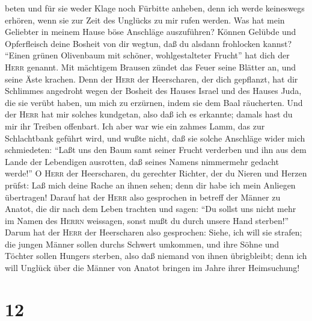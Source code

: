 beten und für sie weder Klage noch Fürbitte anheben, denn ich werde
keineswegs erhören, wenn sie zur Zeit des Unglücks zu mir rufen werden.
 Was hat mein Geliebter in meinem Hause böse Anschläge
auszuführen? Können Gelübde und Opferfleisch deine Bosheit von dir
wegtun, daß du alsdann frohlocken kannst?  ``Einen grünen
Olivenbaum mit schöner, wohlgestalteter Frucht'' hat dich der
\textsc{Herr} genannt. Mit mächtigem Brausen zündet das Feuer seine
Blätter an, und seine Äste krachen.  Denn der
\textsc{Herr} der Heerscharen, der dich gepflanzt, hat dir Schlimmes
angedroht wegen der Bosheit des Hauses Israel und des Hauses Juda, die
sie verübt haben, um mich zu erzürnen, indem sie dem Baal räucherten.
 Und der \textsc{Herr} hat mir solches kundgetan, also
daß ich es erkannte; damals hast du mir ihr Treiben offenbart.
 Ich aber war wie ein zahmes Lamm, das zur Schlachtbank
geführt wird, und wußte nicht, daß sie solche Anschläge wider mich
schmiedeten: ``Laßt uns den Baum samt seiner Frucht verderben und ihn
aus dem Lande der Lebendigen ausrotten, daß seines Namens nimmermehr
gedacht werde!''  O \textsc{Herr} der Heerscharen, du
gerechter Richter, der du Nieren und Herzen prüfst: Laß mich deine Rache
an ihnen sehen; denn dir habe ich mein Anliegen übertragen!
 Darauf hat der \textsc{Herr} also gesprochen in betreff
der Männer zu Anatot, die dir nach dem Leben trachten und sagen: ``Du
sollst uns nicht mehr im Namen des \textsc{Herrn} weissagen, sonst mußt
du durch unsere Hand sterben!''  Darum hat der
\textsc{Herr} der Heerscharen also gesprochen: Siehe, ich will sie
strafen; die jungen Männer sollen durchs Schwert umkommen, und ihre
Söhne und Töchter sollen Hungers sterben,  also daß
niemand von ihnen übrigbleibt; denn ich will Unglück über die Männer von
Anatot bringen im Jahre ihrer Heimsuchung!

\hypertarget{section-11}{%
\section{12}\label{section-11}}

